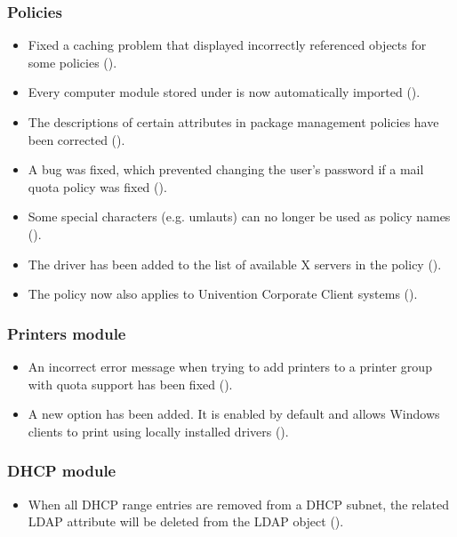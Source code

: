 \subsubsection{Policies}
\begin{itemize}
\item Fixed a caching problem that displayed incorrectly referenced objects for
  some policies ().

\item Every computer module stored under
  is now automatically imported ().

\item The descriptions of certain attributes in package management policies have
  been corrected ().

\item A bug was fixed, which prevented changing the user's password if
  a mail quota policy was fixed ().

\item Some special characters (e.g. umlauts) can no longer be used as
  policy names ().

\item The  driver has been added to the list of
  available X servers in the  policy ().

\item The \ucsUCR{} policy now also applies to Univention Corporate
  Client systems ().

\end{itemize}

\subsubsection{Printers module}
\begin{itemize}
\item An incorrect error message when trying to add printers to a
  printer group with quota support has been fixed ().
\item A new option  has been added.
  It is enabled by default and allows Windows clients to print using
  locally installed drivers ().
\end{itemize}

\subsubsection{DHCP module}
\begin{itemize}
\item When all DHCP range entries are removed from a DHCP subnet, the
  related LDAP attribute  will be deleted from the
  LDAP object ().
\end{itemize}

